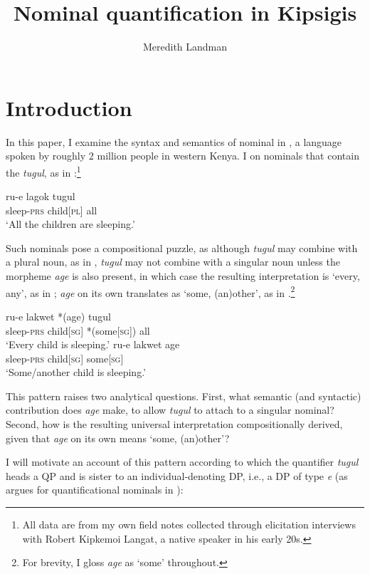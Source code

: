 \documentclass[output=paper]{LSP/langsci}
\author{Meredith Landman \affiliation{Pomona College}}
\title{Nominal quantification in Kipsigis}
\begin{document}
\section{Introduction}\label{sec:landman:introduction}

In this paper, I examine the syntax and semantics of nominal  in , a  language spoken by roughly 2 million people in western Kenya. I  on nominals that contain the  \textit{tugul}, as in :\footnote{All data are from my own field notes collected through elicitation interviews with Robert Kipkemoi Langat, a native  speaker in his early 20s.}

\ea \label{ex:landman:1}
	\gll ru-e lagok tugul\\
       	 sleep-\textsc{prs} child[\textsc{pl}] all\\
  \glt ‘All the children are sleeping.’
\z

\noindent Such nominals pose a compositional puzzle, as although \textit{tugul} may combine with a plural noun, as in , \textit{tugul} may not combine with a singular noun unless the morpheme \textit{age} is also present, in which case the resulting interpretation is ‘every, any’, as in ; \textit{age} on its own translates as ‘some, (an)other’, as in .\footnote{For brevity, I gloss \textit{age} as ‘some’ throughout.}

\ea
  \ea \label{ex:landman:2a}
    \gll ru-e lakwet *(age) tugul\\
       sleep-\textsc{prs} child[\textsc{sg}] *(some[\textsc{sg}]) all\\
    \glt ‘Every child is sleeping.’
  \ex \label{ex:landman:2b}
    \gll ru-e lakwet age\\
       	 sleep-\textsc{prs} child[\textsc{sg}] some[\textsc{sg}]\\
    \glt ‘Some/another child is sleeping.’
  \z
\z

\noindent This pattern raises two analytical questions. First, what semantic (and syntactic) contribution does \textit{age} make, to allow \textit{tugul} to attach to a singular nominal? Second, how is the resulting universal interpretation compositionally derived, given that \textit{age} on its own means ‘some, (an)other’?

I will motivate an account of this pattern according to which the quantifier \textit{tugul} heads a QP and is sister to an individual-denoting DP, i.e., a DP of type \textit{e} (as \citealt{Matthewson:2001} argues for quantificational nominals in ):
\end{document}
